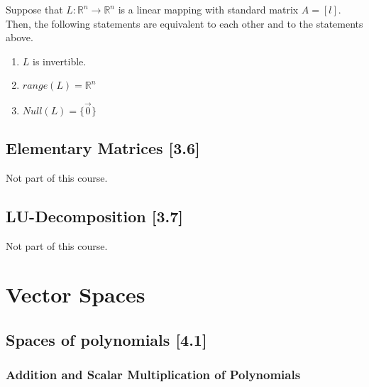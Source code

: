 \documentclass[a4paper,9pt]{extarticle}
\begin{document}
\begin{multicols*}{2}
Suppose that $L: \mathbb{R}^n \to \mathbb{R}^n$ is a linear mapping with standard matrix $A = [l]$. Then, the following statements are equivalent to each other and to the statements above.

\begin{enumerate}[label=\bfseries (\arabic*)] \itemsep0pt \parskip0pt 
    \setcounter{enumi}{6}
    \item $L$ is invertible.
    \item $range(L) = \mathbb{R}^n$
    \item $Null(L) = \{\vec{0}\}$
\end{enumerate}


\subsection{Elementary Matrices [3.6]}
Not part of this course.

\subsection{LU-Decomposition [3.7]}
Not part of this course.




\section{Vector Spaces}

\subsection{Spaces of polynomials [4.1]}

\subsubsection{Addition and Scalar Multiplication of Polynomials}


\end{multicols*}
\end{document}
